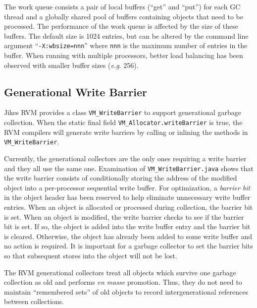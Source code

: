 The work queue consists a pair of local buffers (``get'' and ``put'') for each GC thread
and a globally shared pool of buffers containing objects that need to be processed.  
The performance of the work queue is affected by the size of these buffers.  
The default size is 1024 entries, but can be altered by the command line argument ``{\tt -X:wbsize=nnn}'' 
where {\tt nnn} is the maximum number of entries in the buffer.  When running with multiple
processors, better load balancing has been observed with smaller buffer sizes ({\it e.g}. 256).

\subsection{Generational Write Barrier} \label{sssec:writebarrier}
Jikes RVM provides a class {\tt VM\_WriteBarrier} to support generational garbage collection.
When the static final field {\tt VM\_Allocator.writeBarrier} is true,
the RVM compilers will generate write barriers by calling or inlining the methods in
{\tt VM\_WriteBarrier}.

Currently, the generational collectors are the only ones requiring a write barrier
and they all use the same one.  Examination of {\tt VM\_WriteBarrier.java} shows
that the write barrier consists of conditionally storing the address of the modified object
into a per-processor sequential write buffer.  For optimization, a {\it barrier bit} in the object header
has been reserved to help eliminate unnecessary write buffer entries.
When an object is allocated or processed during collection, the barrier bit is set.
When an object is modified, the write barrier checks to see if the barrier bit is set.
If so, the object is added into the write buffer entry and the barrier bit is cleared.
Otherwise, the object has already been added to some write buffer and no action is required.
It is important for a garbage collector to set the barrier bits so that
subsequent stores into the object will not be lost.

The RVM generational collectors treat all objects which survive one garbage collection as old
and performs {\it en masse} promotion.  Thus, they do not need to maintain ``remembered sets''
of old objects to record intergenerational references between collections.




